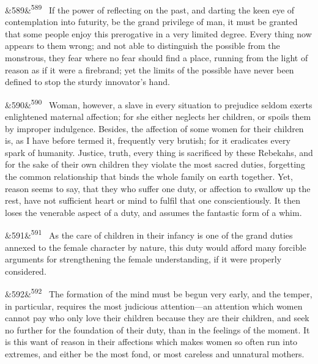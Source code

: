 \documentclass[12pt]{article}
\newcommand{\para}[1][]{\par\noindent\ifx&#1&\else\textsuperscript{\footnotesize #1}~\fi}
\begin{document}
\para[589] If the power of reflecting on the past, and darting the keen eye of contemplation into futurity, be the grand privilege of man, it must be granted that some people enjoy this prerogative in a very limited degree. Every thing now appears to them wrong; and not able to distinguish the possible from the monstrous, they fear where no fear should find a place, running from the light of reason as if it were a firebrand; yet the limits of the possible have never been defined to stop the sturdy innovator's hand.

\para[590] Woman, however, a slave in every situation to prejudice seldom exerts enlightened maternal affection; for she either neglects her children, or spoils them by improper indulgence. Besides, the affection of some women for their children is, as I have before termed it, frequently very brutish; for it eradicates every spark of humanity. Justice, truth, every thing is sacrificed by these Rebekahs, and for the sake of their own children they violate the most sacred duties, forgetting the common relationship that binds the whole family on earth together. Yet, reason seems to say, that they who suffer one duty, or affection to swallow up the rest, have not sufficient heart or mind to fulfil that one conscientiously. It then loses the venerable aspect of a duty, and assumes the fantastic form of a whim.

\para[591] As the care of children in their infancy is one of the grand duties annexed to the female character by nature, this duty would afford many forcible arguments for strengthening the female understanding, if it were properly considered.

\para[592] The formation of the mind must be begun very early, and the temper, in particular, requires the most judicious attention---an attention which women cannot pay who only love their children because they are their children, and seek no further for the foundation of their duty, than in the feelings of the moment. It is this want of reason in their affections which makes women so often run into extremes, and either be the most fond, or most careless and unnatural mothers.
\end{document}
